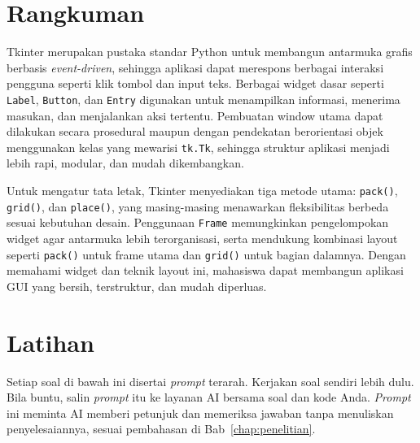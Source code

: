 \section{Rangkuman}

Tkinter merupakan pustaka standar Python untuk membangun antarmuka grafis berbasis \textit{event-driven}, sehingga aplikasi dapat merespons berbagai interaksi pengguna seperti klik tombol dan input teks. Berbagai widget dasar seperti \texttt{Label}, \texttt{Button}, dan \texttt{Entry} digunakan untuk menampilkan informasi, menerima masukan, dan menjalankan aksi tertentu. Pembuatan window utama dapat dilakukan secara prosedural maupun dengan pendekatan berorientasi objek menggunakan kelas yang mewarisi \texttt{tk.Tk}, sehingga struktur aplikasi menjadi lebih rapi, modular, dan mudah dikembangkan.

Untuk mengatur tata letak, Tkinter menyediakan tiga metode utama: \texttt{pack()}, \texttt{grid()}, dan \texttt{place()}, yang masing-masing menawarkan fleksibilitas berbeda sesuai kebutuhan desain. Penggunaan \texttt{Frame} memungkinkan pengelompokan widget agar antarmuka lebih terorganisasi, serta mendukung kombinasi layout seperti \texttt{pack()} untuk frame utama dan \texttt{grid()} untuk bagian dalamnya. Dengan memahami widget dan teknik layout ini, mahasiswa dapat membangun aplikasi GUI yang bersih, terstruktur, dan mudah diperluas.


\section{Latihan}

Setiap soal di bawah ini disertai \textit{prompt} terarah. Kerjakan soal sendiri lebih dulu. Bila buntu, salin \textit{prompt} itu ke layanan AI bersama soal dan kode Anda. \textit{Prompt} ini meminta AI memberi petunjuk dan memeriksa jawaban tanpa menuliskan penyelesaiannya, sesuai pembahasan di Bab~\ref{chap:penelitian}.


